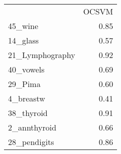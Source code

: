 \begin{tabular}{lr}
 & OCSVM \\
45_wine & 0.85 \\
14_glass & 0.57 \\
21_Lymphography & 0.92 \\
40_vowels & 0.69 \\
29_Pima & 0.60 \\
4_breastw & 0.41 \\
38_thyroid & 0.91 \\
2_annthyroid & 0.66 \\
28_pendigits & 0.86 \\
\end{tabular}
